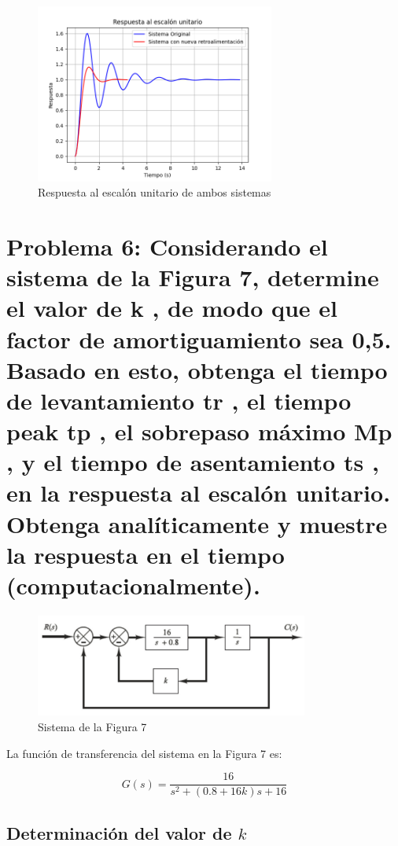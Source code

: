 \documentclass[10pt]{article}
\theoremstyle{definition}
\theoremstyle{remark}
\theoremstyle{definition}
\numberwithin{equation}{prob}
\begin{document}
\begin{figure}[h]
	\centering
	\includegraphics[width=0.7\textwidth]{./figures/Figura 6 ejercicio 5.png}
	\caption{Respuesta al escalón unitario de ambos sistemas}
\end{figure}

\newpage

\section{Problema 6: Considerando el sistema de la Figura 7, determine el valor de k , de modo que el factor de
  amortiguamiento sea 0,5. Basado en esto, obtenga el tiempo de levantamiento tr , el tiempo
  peak tp , el sobrepaso máximo Mp , y el tiempo de asentamiento ts , en la respuesta al escalón
  unitario. Obtenga analíticamente y muestre la respuesta en el tiempo (computacionalmente).}

\begin{figure}[h]
	\centering
	\includegraphics[width=0.8\textwidth]{./figures/Figura 7 ejercicio 6.png}
	\caption{Sistema de la Figura 7}
\end{figure}


La función de transferencia del sistema en la Figura 7 es:

\[
	G(s) = \frac{16}{s^2 + (0.8 + 16k)s + 16}
\]

\subsection{Determinación del valor de \texorpdfstring{\(k\)}{k}}
\end{document}
